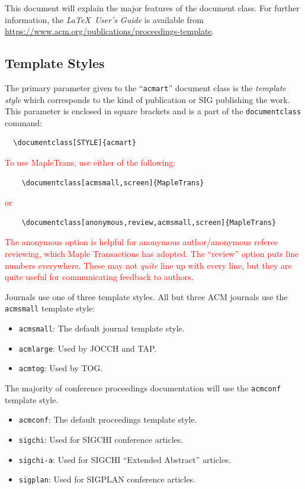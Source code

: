 \documentclass[anonymous,review,acmsmall,screen]{MapleTrans}
\begin{document}
This document will explain the major features of the document
class. For further information, the {\itshape \LaTeX\ User's Guide} is
available from
\url{https://www.acm.org/publications/proceedings-template}.

\subsection{Template Styles}

The primary parameter given to the ``\verb|acmart|'' document class is
the {\itshape template style} which corresponds to the kind of publication
or SIG publishing the work. This parameter is enclosed in square
brackets and is a part of the {\verb|documentclass|} command:
\begin{verbatim}
  \documentclass[STYLE]{acmart}
\end{verbatim}
\textcolor{red}{To use MapleTrans, use either of the following:}
\begin{verbatim}
    \documentclass[acmsmall,screen]{MapleTrans}
\end{verbatim}
\textcolor{red}{or}
\begin{verbatim}
    \documentclass[anonymous,review,acmsmall,screen]{MapleTrans}
\end{verbatim}
\textcolor{red}{The anonymous option is helpful for anonymous author/anonymous referee reviewing, which Maple Transactions has adopted.}
\textcolor{red}{The ``review'' option puts line numbers everywhere.  These may not \textsl{quite} line up with every line, but they are quite useful for communicating feedback to authors.}


Journals use one of three template styles. All but three ACM journals
use the {\verb|acmsmall|} template style:
\begin{itemize}
\item {\verb|acmsmall|}: The default journal template style.
\item {\verb|acmlarge|}: Used by JOCCH and TAP.
\item {\verb|acmtog|}: Used by TOG.
\end{itemize}

The majority of conference proceedings documentation will use the {\verb|acmconf|} template style.
\begin{itemize}
\item {\verb|acmconf|}: The default proceedings template style.
\item{\verb|sigchi|}: Used for SIGCHI conference articles.
\item{\verb|sigchi-a|}: Used for SIGCHI ``Extended Abstract'' articles.
\item{\verb|sigplan|}: Used for SIGPLAN conference articles.
\end{itemize}
\end{document}
